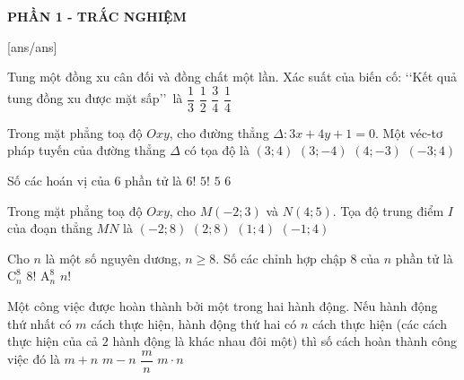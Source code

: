 
\begin{center}
	\textbf{PHẦN 1 - TRẮC NGHIỆM}
\end{center}
[ans/ans]
\begin{ex}%
	Tung một đồng xu cân đối và đồng chất một lần. Xác suất của biến cố:  \lq\lq Kết quả tung đồng xu được mặt sấp\rq\rq\, là
	\choice
	{$\dfrac{1}{3}$}
	{\True $\dfrac{1}{2}$}
	{$\dfrac{3}{4}$}
	{$\dfrac{1}{4}$}
\end{ex}
\begin{ex}%
	Trong mặt phẳng toạ độ $Oxy$, cho đường thẳng $\Delta\colon 3x+4y+1=0$. Một véc-tơ pháp tuyến của đường thẳng $\Delta$ có tọa độ là
	\choice
	{\True $(3; 4)$}
	{$(3; -4)$}
	{$(4; -3)$}
	{$(-3; 4)$}
\end{ex}
\begin{ex}%
	Số các hoán vị của $6$ phần tử là
	\choice
	{\True $6!$}
	{$5!$}
	{$5$}
	{$6$}
\end{ex}
\begin{ex}%
	Trong mặt phẳng toạ độ $Oxy$, cho $M(-2; 3)$ và $N(4; 5)$. Tọa độ trung điểm $I$ của đoạn thẳng $MN$ là
	\choice
	{ $(-2; 8)$}
	{$(2; 8)$}
	{\True $(1; 4)$}
	{$(-1; 4)$}
\end{ex}
\begin{ex}%
	Cho $n$ là một số nguyên dương, $n \geq 8$. Số các chỉnh hợp chập 8 của $n$ phần tử là
	\choice
	{$\mathrm{C}_{n}^8$}
	{$8!$}
	{\True $\mathrm{A}_{n}^8$}
	{$n!$}
\end{ex}
\begin{ex}%
	Một công việc được hoàn thành bởi một trong hai hành động. Nếu hành động thứ nhất có $m$ cách thực hiện, hành động thứ hai có $n$ cách thực hiện (các cách thực hiện của cả $2$ hành động là khác nhau đôi một) thì số cách hoàn thành công việc đó là
	\choice
	{\True $m+n$}
	{$m-n$}
	{$\dfrac{m}{n}$}
	{$m \cdot n$}
\end{ex}
